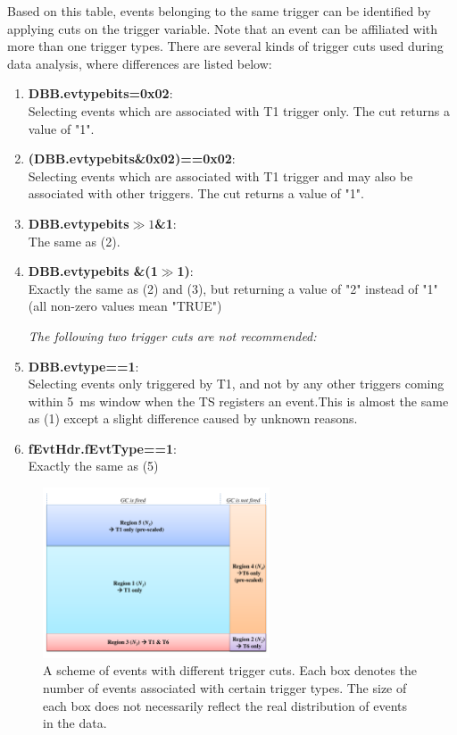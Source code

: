  Based on this table, events belonging to the same trigger can be identified by applying cuts on the trigger variable. Note that an event can be affiliated with more than one trigger types. There are several kinds of trigger cuts used during data analysis, where differences are listed below:
 \begin{enumerate}
\item \textbf{DBB.evtypebits=0x02}: \\
    Selecting events which are associated with T1 trigger only. The cut returns a value of "1".
\item \textbf{(DBB.evtypebits\&0x02)==0x02}: \\
    Selecting events which are associated with T1 trigger and may also be associated with other triggers. The cut returns a value of "1".
\item \textbf{DBB.evtypebits$\gg1$\&1}: \\
    The same as (2).
\item \textbf{DBB.evtypebits \&(1$\gg$1)}: \\
    Exactly the same as (2) and (3), but returning a value of "2" instead of "1" (all non-zero values mean "TRUE")

\emph{The following two trigger cuts are not recommended:}
\item \textbf{DBB.evtype==1}: \\
     Selecting events only triggered by T1, and not by any other triggers coming within 5~ms window when the TS registers an event.This is almost the same as (1) except a slight difference caused by unknown reasons. 
\item \textbf{fEvtHdr.fEvtType==1}:\\
     Exactly the same as (5)
\end{enumerate}
\begin{figure}[!ht]
 \begin{center}
  \includegraphics[width=0.6\textwidth]{./figures/trigger/trigger_region}
  \caption[A scheme of events with different trigger cuts]{A scheme of events with different trigger cuts. Each box denotes the number of events associated with certain trigger types. The size of each box does not necessarily reflect the real distribution of events in the data.}
  \label{trig_region}
 \end{center}
\end{figure}

